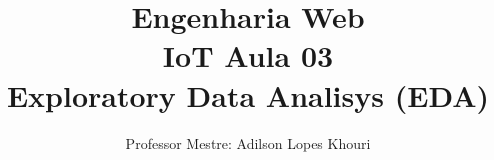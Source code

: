 \documentclass[compress, hyperref={pdfpagelayout=SinglePage}]{beamer}
\title[IoT - Aula 03]{Engenharia Web \\ IoT Aula 03 \\ Exploratory Data Analisys (EDA)}
\author{Professor Mestre: Adilson Lopes Khouri}
\begin{document}
	\begin{frame}
		\titlepage
	\end{frame}
	
	
	
	
	
	
%	
%
%	
				
	

	
	
\end{document}
